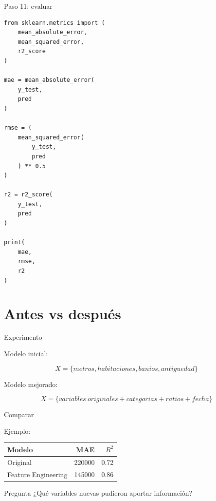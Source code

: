 \documentclass[aspectratio=169,11pt]{beamer}
\begin{document}

\begin{frame}[fragile]{Paso 11: evaluar}

\begin{lstlisting}
from sklearn.metrics import (
    mean_absolute_error,
    mean_squared_error,
    r2_score
)

mae = mean_absolute_error(
    y_test,
    pred
)

rmse = (
    mean_squared_error(
        y_test,
        pred
    ) ** 0.5
)

r2 = r2_score(
    y_test,
    pred
)

print(
    mae,
    rmse,
    r2
)
\end{lstlisting}

\end{frame}

\section{Antes vs después}

\begin{frame}{Experimento}

Modelo inicial:

\[
X=
\{
metros,
habitaciones,
banios,
antiguedad
\}
\]

Modelo mejorado:

\[
X=
\{
variables\ originales
+
categorias
+
ratios
+
fecha
\}
\]

\end{frame}


\begin{frame}{Comparar}

Ejemplo:

\begin{center}

\begin{tabular}{lrr}
\toprule
Modelo & MAE & $R^2$ \\
\midrule

Original & 220000 & 0.72 \\

Feature Engineering & 145000 & 0.86 \\

\bottomrule
\end{tabular}

\end{center}

\vspace{0.5cm}

\begin{exampleblock}{Pregunta}
¿Qué variables nuevas pudieron aportar información?
\end{exampleblock}

\end{frame}
\end{document}
